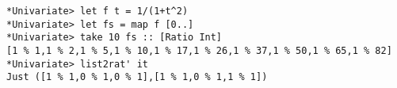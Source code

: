 \documentclass[10pt]{article}
\begin{document}
\begin{verbatim}
*Univariate> let f t = 1/(1+t^2)
*Univariate> let fs = map f [0..]
*Univariate> take 10 fs :: [Ratio Int]
[1 % 1,1 % 2,1 % 5,1 % 10,1 % 17,1 % 26,1 % 37,1 % 50,1 % 65,1 % 82]
*Univariate> list2rat' it
Just ([1 % 1,0 % 1,0 % 1],[1 % 1,0 % 1,1 % 1])
\end{verbatim}
\end{document}
